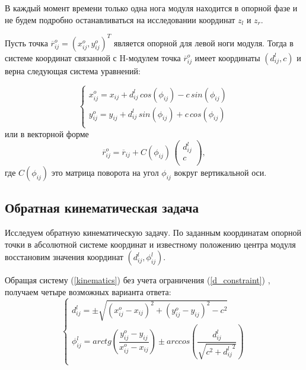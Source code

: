 В каждый момент времени только одна нога модуля находится в опорной фазе и не будем подробно останавливаться на исследовании координат $z_l$ и $z_r$.

Пусть точка $\overline{r}^o_{ij} = (x^o_{ij},y^o_{ij})^T$ является опорной для левой ноги модуля. Тогда в системе координат связанной с H-модулем точка $\overline{r}^o_{ij}$ имеет координаты $(d^l_{ij},c)$ и верна следующая система уравнений:

	\begin{equation}
	\label{kinematics}
	\left\{
	\begin{array}{lcr}
	x^o_{ij} = x_{ij} + d^l_{ij}\,cos(\phi_{ij})-c\,sin(\phi_{ij})\\
	y^o_{ij} = y_{ij} + d^l_{ij}\,sin(\phi_{ij})+c\,cos(\phi_{ij})\\
	\end{array}
	\right.
	\end{equation}
	или в векторной форме
	\begin{equation}
	\label{kinematics_vector}
	\overline{r}^o_{ij} = \overline{r}_{ij}+ C(\phi_{ij})\,
	\left(
	\begin{array}{lll}
	d^l_{ij}\\
	c\\
	\end{array}
	\right),
	\end{equation}
	где $C(\phi_{ij})$ это матрица поворота на угол $\phi_{ij}$ вокруг вертикальной оси.\\
	
\subsection{Обратная кинематическая задача}
Исследуем обратную кинематическую задачу. По заданным координатам опорной точки в абсолютной системе координат и известному положению центра модуля восстановим значения координат $(d^l_{ij},\phi^l_{ij})$.

Обращая систему (\ref{kinematics}) без учета ограничения (\ref{d_constraint}) , получаем четыре возможных варианта ответа:
	\begin{equation}\label{revkin}
	\left\{
	\begin{array}{lcr}
	d^l_{ij} = \pm\sqrt{(x^o_{ij}-x_{ij})^2+(y^o_{ij}-y_{ij})^2-c^2}\\
	\phi^l_{ij}  = arctg\left(\dfrac{y^o_{ij}-y_{ij}}{x^o_{ij}-x_{ij}}\right) \pm arccos\left(\dfrac{d^l_{ij}}{\sqrt{c^2+{d^l_{ij}}^2}}\right)\\ 
	\end{array}
	\right.
	\end{equation}
	
